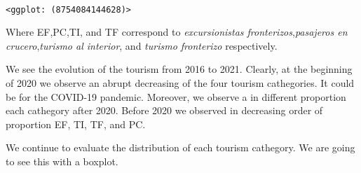 \documentclass[11pt]{article}
\makeatletter
\newcommand{\boxspacing}{\kern\kvtcb@left@rule\kern\kvtcb@boxsep}
\newcommand{\prompt}[4]{
        {\ttfamily\llap{{\color{#2}[#3]:\hspace{3pt}#4}}\vspace{-\baselineskip}}
    }
\makeatother
\begin{document}
    \begin{center}
    \end{center}
    { \hspace*{\fill} \\}
    
            \begin{tcolorbox}[breakable, size=fbox, boxrule=.5pt, pad at break*=1mm, opacityfill=0]
\prompt{Out}{outcolor}{15}{\boxspacing}
\begin{Verbatim}[commandchars=\\\{\}]
<ggplot: (8754084144628)>
\end{Verbatim}
\end{tcolorbox}
        
    Where EF,PC,TI, and TF correspond to \emph{excursionistas
fronterizos},\emph{pasajeros en crucero},\emph{turismo al interior}, and
\emph{turismo fronterizo} respectively.

We see the evolution of the tourism from 2016 to 2021. Clearly, at the
beginning of 2020 we observe an abrupt decreasing of the four tourism
cathegories. It could be for the COVID-19 pandemic. Moreover, we observe
a in different proportion each cathegory after 2020. Before 2020 we
observed in decreasing order of proportion EF, TI, TF, and PC.

    We continue to evaluate the distribution of each tourism cathegory. We
are going to see this with a boxplot.
\end{document}

